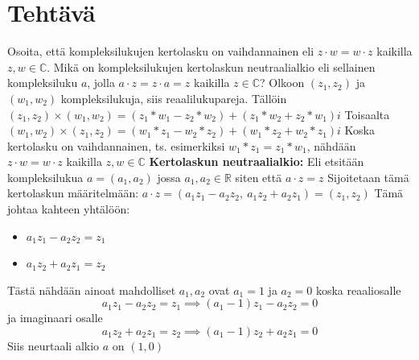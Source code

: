 \documentclass{article}
\newcounter{tehtava}
\begin{document}
\newpage
{}
\section*{Tehtävä \thetehtava}
Osoita, että kompleksilukujen kertolasku on vaihdannainen eli $z \cdot w = w \cdot z$ kaikilla $z, w \in \mathbb{C}$. Mikä on kompleksilukujen kertolaskun neutraalialkio eli sellainen kompleksiluku $a$, jolla $a \cdot z = z \cdot a = z$ kaikilla $z \in \mathbb{C}$?\newline
\linebreak
Olkoon $(z_1, z_2)$ ja $(w_1, w_2)$ kompleksilukuja, siis reaalilukupareja.\newline
Tällöin $(z_1, z_2) \times (w_1, w_2) = (z_1 * w_1 - z_2 * w_2) + (z_1 * w_2 + z_2 * w_1)i$\newline
\linebreak
Toisaalta $(w_1, w_2) \times (z_1, z_2) = (w_1 * z_1 - w_2 * z_2) + (w_1 * z_2 + w_2 * z_1)i$\newline
\linebreak
Koska kertolasku on vaihdannainen, ts. esimerkiksi $w_1 * z_1 = z_1 * w_1$, nähdään $z \cdot w = w \cdot z$ kaikilla $z, w \in \mathbb{C}$\newline
\linebreak
\textbf{Kertolaskun neutraalialkio:}\newline
Eli etsitään kompleksilukua $a = (a_1, a_2)$ jossa $a_1, a_2 \in \mathbb{R}$ siten että $a \cdot z = z$\newline
Sijoitetaan tämä kertolaskun määritelmään:\newline
$a \cdot z = \left( a_1 z_1 - a_2 z_2, \ a_1 z_2 + a_2 z_1 \right) = (z_1, z_2)$\newline
\linebreak
Tämä johtaa kahteen yhtälöön:
\begin{itemize}
    \item $a_1 z_1 - a_2 z_2 = z_1$
    \item $a_1 z_2 + a_2 z_1 = z_2$
\end{itemize}
Tästä nähdään ainoat mahdolliset $a_1, a_2$ ovat $a_1 = 1$ ja $a_2 = 0$ koska reaaliosalle
\[
a_1 z_1 - a_2 z_2 = z_1 \implies (a_1 - 1) z_1 - a_2 z_2 = 0
\]
ja imaginaari osalle
\[
a_1 z_2 + a_2 z_1 = z_2 \implies (a_1 - 1) z_2 + a_2 z_1 = 0
\]
Siis neurtaali alkio $a$ on $(1, 0)$

\newpage
{}
\end{document}
